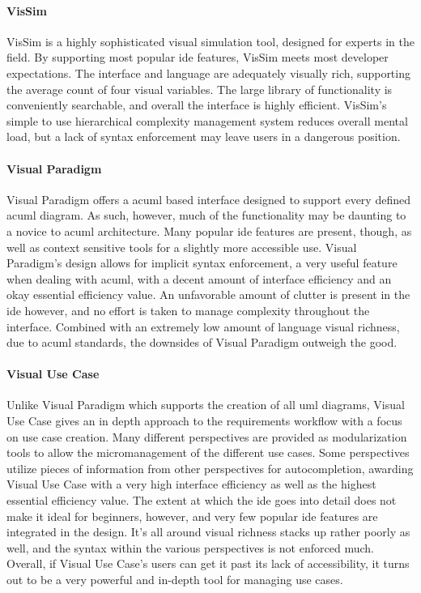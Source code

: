 \paragraph{VisSim} VisSim is a highly sophisticated visual simulation tool,
designed for experts in the field. By supporting most popular \ac{ide}
features, VisSim meets most developer expectations. The interface and
language are adequately visually rich, supporting the average count of four
visual variables. The large library of functionality is conveniently
searchable, and overall the interface is highly efficient. VisSim's simple
to use hierarchical complexity management system reduces overall mental
load, but a lack of syntax enforcement may leave users in a dangerous
position.

\paragraph{Visual Paradigm} Visual Paradigm offers a ac{uml} based
interface designed to support every defined ac{uml} diagram. As such,
however, much of the functionality may be daunting to a novice to ac{uml}
architecture. Many popular \ac{ide} features are present, though, as well
as context sensitive tools for a slightly more accessible use. Visual
Paradigm's design allows for implicit syntax enforcement, a very useful
feature when dealing with ac{uml}, with a decent amount of interface
efficiency and an okay essential efficiency value. An unfavorable amount of
clutter is present in the \ac{ide} however, and no effort is taken to
manage complexity throughout the interface. Combined with an extremely low
amount of language visual richness, due to ac{uml} standards, the downsides
of Visual Paradigm outweigh the good.

\paragraph{Visual Use Case} Unlike Visual Paradigm which supports the
creation of all \ac{uml} diagrams, Visual Use Case gives an in depth
approach to the requirements workflow with a focus on use case creation.
Many different perspectives are provided as modularization tools to allow
the micromanagement of the different use cases. Some perspectives utilize
pieces of information from other perspectives for autocompletion, awarding
Visual Use Case with a very high interface efficiency as well as the
highest essential efficiency value. The extent at which the \ac{ide} goes
into detail does not make it ideal for beginners, however, and very few
popular \ac{ide} features are integrated in the design. It's all around
visual richness stacks up rather poorly as well, and the syntax within the
various perspectives is not enforced much. Overall, if Visual Use Case's
users can get it past its lack of accessibility, it turns out to be a very
powerful and in-depth tool for managing use cases.

